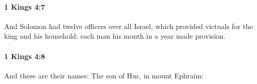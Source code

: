 		\paragraph{1 Kings 4:7} %
			\label{1KINGS-4-7}

			And Solomon had twelve officers over all Israel, which provided victuals for the king and his household: each man his month in a year made provision.


		\paragraph{1 Kings 4:8} %
			\label{1KINGS-4-8}

			And these are their names: The son of Hur, in mount Ephraim:


